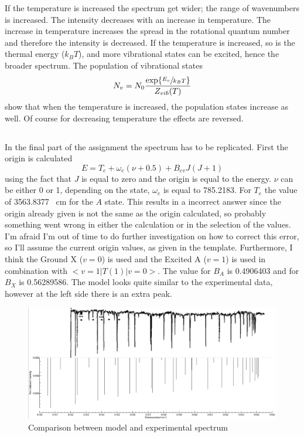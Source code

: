 If the temperature is increased the spectrum get wider; the range of wavenumbers is increased. The intensity decreases with an increase in temperature. The increase in temperature increases the spread in the rotational quantum number and therefore the intensity is decreased. If the temperature is increased, so is the thermal energy ($k_B T$), and more vibrational states can be excited, hence the broader spectrum. The population of vibrational states
\begin{equation}
	N_v = N_0 \dfrac{\exp \lbrace\sfrac{E_v}{k_B T}\rbrace}{Z_{vib}(T)}
\end{equation}
show that when the temperature is increased, the population states increase as well. Of course for decreasing temperature the effects are reversed.

\subsection{}
In the final part of the assignment the  spectrum has to be replicated. First the origin is calculated  
\begin{equation}
	E = T_e + \omega_e (\nu + 0.5) + B_{ev} J (J+1)
\end{equation}
using the fact that $J$ is equal to zero and the origin is equal to the energy. $\nu$ can be either 0 or 1, depending on the state, $\omega_e$ is equal to 785.2183. For $T_e$ the value of 3563.8377 \si{\per \cm} for the $A$ state. This results in a incorrect answer since the origin already given is not the same as the origin calculated, so probably something went wrong in either the calculation or in the selection of the values. I'm afraid I'm out of time to do further investigation on how to correct this error, so I'll assume the current origin values, as given in the template. Furthermore, I think the Ground X ($v=0$) is used and the Excited A ($v=1$) is used in combination with  $<v=1|T(1)|v=0>$. The value for $B_A$ is 0.4906403 and for $B_X$ is 0.56289586. The model looks quite similar to the experimental data, however at the left side there is an extra peak. 

\begin{figure}[H]
	\centering 
	\includegraphics[width=\linewidth]{figures/samen.png}
	\caption{Comparison between model and experimental  spectrum}
\end{figure} 

